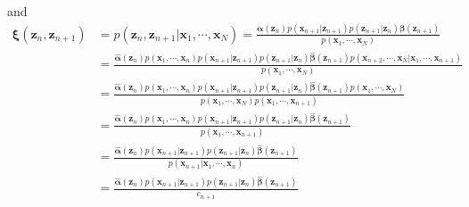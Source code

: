 \documentclass[a4]{article}
\begin{document}
and
\begin{equation}
\begin{aligned}
\bm{\xi}(\bm{z}_n, \bm{z}_{n+1})
&= p(\bm{z}_n, \bm{z}_{n+1}|\bm{x}_1, \cdots, \bm{x}_N)
= \frac{
    \bm{\alpha}(\bm{z}_n)
    p(\bm{x}_{n+1}|\bm{z}_{n+1})p(\bm{z}_{n+1}|\bm{z}_{n})
    \bm{\beta}(\bm{z}_{n+1})
}
{
    p(\bm{x}_1, \cdots, \bm{x}_N)
}\\
&= \frac{
    \bm{\hat{\alpha}}(\bm{z}_n)p(\bm{x}_1, \cdots, \bm{x}_n)
    p(\bm{x}_{n+1}|\bm{z}_{n+1})p(\bm{z}_{n+1}|\bm{z}_{n})
    \bm{\hat{\beta}}(\bm{z}_{n+1})
    p(\bm{x}_{n+2}, \cdots, \bm{x}_N|\bm{x}_{1}, \cdots, \bm{x}_{n+1})
}
{
    p(\bm{x}_1, \cdots, \bm{x}_N)
}\\
&= \frac{
    \bm{\hat{\alpha}}(\bm{z}_n)p(\bm{x}_1, \cdots, \bm{x}_n)
    p(\bm{x}_{n+1}|\bm{z}_{n+1})p(\bm{z}_{n+1}|\bm{z}_{n})
    \bm{\hat{\beta}}(\bm{z}_{n+1})
    p(\bm{x}_{1}, \cdots, \bm{x}_N)
}
{
    p(\bm{x}_1, \cdots, \bm{x}_N)    p(\bm{x}_1, \cdots, \bm{x}_{n+1})
}\\
&= \frac{
    \bm{\hat{\alpha}}(\bm{z}_n)p(\bm{x}_1, \cdots, \bm{x}_n)
    p(\bm{x}_{n+1}|\bm{z}_{n+1})p(\bm{z}_{n+1}|\bm{z}_{n})
    \bm{\hat{\beta}}(\bm{z}_{n+1})
}
{
    p(\bm{x}_1, \cdots, \bm{x}_{n+1})
}\\
&= \frac{
    \bm{\hat{\alpha}}(\bm{z}_n)
    p(\bm{x}_{n+1}|\bm{z}_{n+1})p(\bm{z}_{n+1}|\bm{z}_{n})
    \bm{\hat{\beta}}(\bm{z}_{n+1})
}
{
    p(\bm{x}_{n+1} | \bm{x}_1, \cdots, \bm{x}_{n})
}\\
&= \frac{
    \bm{\hat{\alpha}}(\bm{z}_n)
    p(\bm{x}_{n+1}|\bm{z}_{n+1})p(\bm{z}_{n+1}|\bm{z}_{n})
    \bm{\hat{\beta}}(\bm{z}_{n+1})
}
{
    c_{n+1}
}\\
\end{aligned}
\end{equation}
\end{document}
